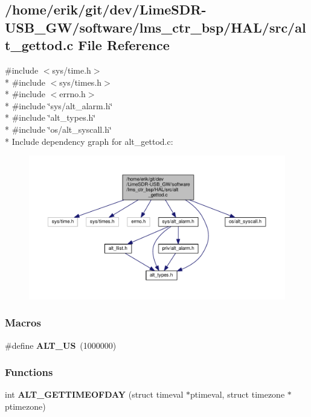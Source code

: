 \subsection{/home/erik/git/dev/\+Lime\+S\+D\+R-\/\+U\+S\+B\+\_\+\+G\+W/software/lms\+\_\+ctr\+\_\+bsp/\+H\+A\+L/src/alt\+\_\+gettod.c File Reference}
\label{alt__gettod_8c}
{\ttfamily \#include $<$sys/time.\+h$>$}\\*
{\ttfamily \#include $<$sys/times.\+h$>$}\\*
{\ttfamily \#include $<$errno.\+h$>$}\\*
{\ttfamily \#include \char`\"{}sys/alt\+\_\+alarm.\+h\char`\"{}}\\*
{\ttfamily \#include \char`\"{}alt\+\_\+types.\+h\char`\"{}}\\*
{\ttfamily \#include \char`\"{}os/alt\+\_\+syscall.\+h\char`\"{}}\\*
Include dependency graph for alt\+\_\+gettod.\+c\+:
\nopagebreak
\begin{figure}[H]
\begin{center}
\leavevmode
\includegraphics[width=350pt]{d5/dbf/alt__gettod_8c__incl}
\end{center}
\end{figure}
\subsubsection*{Macros}
\begin{DoxyCompactItemize}
\item 
\#define {\bf A\+L\+T\+\_\+\+US}~(1000000)
\end{DoxyCompactItemize}
\subsubsection*{Functions}
\begin{DoxyCompactItemize}
\item 
int {\bf A\+L\+T\+\_\+\+G\+E\+T\+T\+I\+M\+E\+O\+F\+D\+AY} (struct timeval $\ast$ptimeval, struct timezone $\ast$ptimezone)
\end{DoxyCompactItemize}

